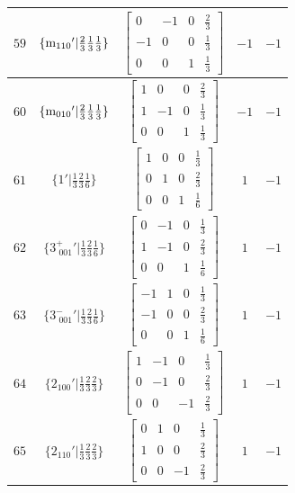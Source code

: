 \documentclass[fleqn,8pt]{jsarticle}
\begin{document}
\begin{longtable}{ccccc}
$ 59 $ & $ \{{\rm m}_{110}{}'|\frac{2}{3} \frac{1}{3} \frac{1}{3}\} $ & $ \begin{bmatrix} 0 & -1 & 0 & \frac{2}{3} \\ -1 & 0 & 0 & \frac{1}{3} \\ 0 & 0 & 1 & \frac{1}{3} \end{bmatrix} $ & $ -1 $ & $ -1 $ \\ \hline
$ 60 $ & $ \{{\rm m}_{010}{}'|\frac{2}{3} \frac{1}{3} \frac{1}{3}\} $ & $ \begin{bmatrix} 1 & 0 & 0 & \frac{2}{3} \\ 1 & -1 & 0 & \frac{1}{3} \\ 0 & 0 & 1 & \frac{1}{3} \end{bmatrix} $ & $ -1 $ & $ -1 $ \\ \hline
$ 61 $ & $ \{1{}'|\frac{1}{3} \frac{2}{3} \frac{1}{6}\} $ & $ \begin{bmatrix} 1 & 0 & 0 & \frac{1}{3} \\ 0 & 1 & 0 & \frac{2}{3} \\ 0 & 0 & 1 & \frac{1}{6} \end{bmatrix} $ & $ 1 $ & $ -1 $ \\ \hline
$ 62 $ & $ \{3^{+}_{\,\,001}{}'|\frac{1}{3} \frac{2}{3} \frac{1}{6}\} $ & $ \begin{bmatrix} 0 & -1 & 0 & \frac{1}{3} \\ 1 & -1 & 0 & \frac{2}{3} \\ 0 & 0 & 1 & \frac{1}{6} \end{bmatrix} $ & $ 1 $ & $ -1 $ \\ \hline
$ 63 $ & $ \{3^{-}_{\,\,001}{}'|\frac{1}{3} \frac{2}{3} \frac{1}{6}\} $ & $ \begin{bmatrix} -1 & 1 & 0 & \frac{1}{3} \\ -1 & 0 & 0 & \frac{2}{3} \\ 0 & 0 & 1 & \frac{1}{6} \end{bmatrix} $ & $ 1 $ & $ -1 $ \\ \hline
$ 64 $ & $ \{2{}_{100}{}'|\frac{1}{3} \frac{2}{3} \frac{2}{3}\} $ & $ \begin{bmatrix} 1 & -1 & 0 & \frac{1}{3} \\ 0 & -1 & 0 & \frac{2}{3} \\ 0 & 0 & -1 & \frac{2}{3} \end{bmatrix} $ & $ 1 $ & $ -1 $ \\ \hline
$ 65 $ & $ \{2{}_{110}{}'|\frac{1}{3} \frac{2}{3} \frac{2}{3}\} $ & $ \begin{bmatrix} 0 & 1 & 0 & \frac{1}{3} \\ 1 & 0 & 0 & \frac{2}{3} \\ 0 & 0 & -1 & \frac{2}{3} \end{bmatrix} $ & $ 1 $ & $ -1 $ \\ \hline

\end{longtable}
\end{document}
